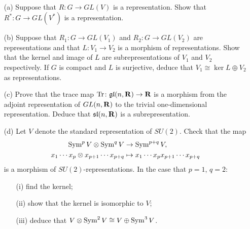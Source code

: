 \documentclass[12pt]{article}
\begin{document}
\begin{question}\ \\
\begin{enumerate}
\item[(a)] Suppose that $R\colon G\to GL(V)$ is a representation. Show that $R^*\colon G\to GL(V^*)$ is a representation.
\item[(b)] Suppose that $R_1\colon G\to GL(V_1)$ and $R_2\colon G\to GL(V_2)$ are representations and that $L\colon V_1\to V_2$ is a morphism of representations. Show that the kernel and image of $L$ are subrepresentations of $V_1$ and $V_2$ respectively. If $G$ is compact and $L$ is surjective, deduce that $V_1\cong \ker L\oplus V_2$ as representations.
\item[(c)] Prove that the trace map $\operatorname{Tr}\colon\mathfrak{gl}(n,\mathbf{R})\to\mathbf{R}$ is a morphism from the adjoint representation of $GL(n,\mathbf{R})$ to the trivial one-dimensional representation. Deduce that $\mathfrak{sl}(n,\mathbf{R})$ is a subrepresentation.
\item[(d)] Let $V$ denote the standard representation of $SU(2)$. Check that the map
\begin{align*}
\operatorname{Sym}^pV\otimes\operatorname{Sym}^qV&\to\operatorname{Sym}^{p+q}V,\\
x_1\cdots x_p\otimes x_{p+1}\cdots x_{p+q}&\mapsto x_1\cdots x_px_{p+1}\cdots x_{p+q}
\end{align*}
is a morphism of $SU(2)$-representations. In the case that $p=1$, $q=2$:
\begin{enumerate}
\item[(i)] find the kernel;
\item[(ii)] show that the kernel is isomorphic to $V$;
\item[(iii)] deduce that $V\otimes\operatorname{Sym}^2V\cong V\oplus\operatorname{Sym}^3V$.
\end{enumerate}
\end{enumerate}
\end{question}
\end{document}
